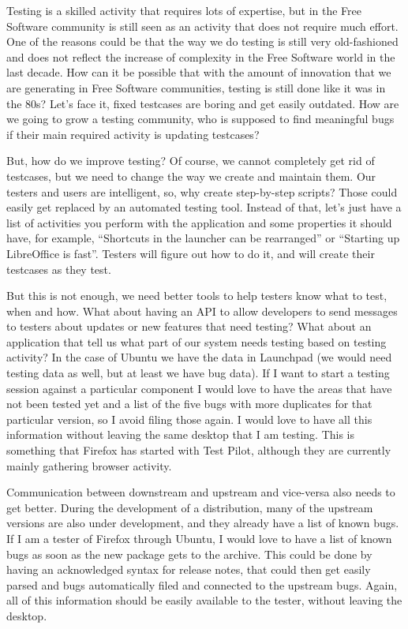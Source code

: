 Testing is a skilled activity that requires lots of expertise, but in the Free Software
community is still seen as an activity that does not require much effort. One of
the reasons could be that the way we do testing is still very old-fashioned and
does not reflect the increase of complexity in the Free Software world in the
last decade. How can it be possible that with the amount of innovation that we
are generating in Free Software communities, testing is still done like it was in
the 80s? Let's face it, fixed testcases are boring and get easily outdated. How
are we going to grow a testing community, who is supposed to find meaningful
bugs if their main required activity is updating testcases?

But, how do we improve testing? Of course, we cannot completely get rid of
testcases, but we need to change the way we create and maintain them. Our
testers and users are intelligent, so, why create step-by-step scripts? Those
could easily get replaced by an automated testing tool. Instead of that, let's
just have a list of activities you perform with the application and some
properties it should have, for example, ``Shortcuts in the launcher can be
rearranged'' or ``Starting up LibreOffice is fast''. Testers will figure out how
to do it, and will create their testcases as they test.

But this is not enough, we need better tools to help testers know what to test,
when and how.  What about having an API to allow developers to send messages to
testers about updates or new features that need testing? What about an
application that tell us what part of our system needs testing based on testing
activity? In the case of Ubuntu we have the data in Launchpad (we would need
testing data as well, but at least we have bug data). If I want to start a
testing session against a particular component I would love to have the areas
that have not been tested yet and a list of the five bugs with more duplicates
for that particular version, so I avoid filing those again. I would love to have
all this information without leaving the same desktop that I am testing. This is
something that Firefox has started with Test Pilot, although they are currently
mainly gathering browser activity.

Communication between downstream and upstream and vice-versa also needs to get
better. During the development of a distribution, many of the upstream versions
are also under development, and they already have a list of known bugs. If I am
a tester of Firefox through Ubuntu, I would love to have a list of known bugs as
soon as the new package gets to the archive. This could be done by having an
acknowledged syntax for release notes, that could then get easily parsed and
bugs automatically filed and connected to the upstream bugs. Again, all of this
information should be easily available to the tester, without leaving the
desktop.

